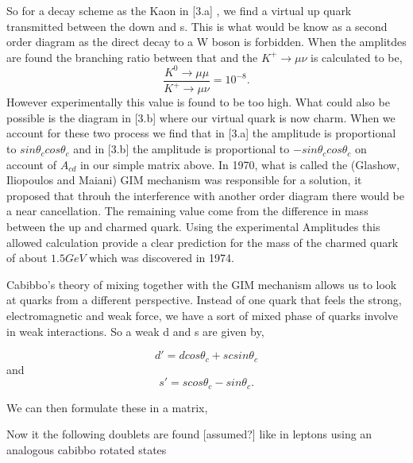 \documentclass[floatfix,aps,prd,amsmath,amssymb]{revtex4}
\begin{document}
So for a decay scheme as the Kaon in [3.a] , we find a virtual up quark transmitted between the down and s. This is what would be know as a second order diagram as the direct decay to a W boson is forbidden.
When the amplitdes are found the branching ratio between that and the $K^+\rightarrow\mu\nu$ is calculated to be,
 \[\frac{K^0\rightarrow\mu\mu}{K^+\rightarrow\mu\nu}=10^{-8}.\]
However experimentally this value is found to be too high. What could also be possible is the diagram in [3.b] where our virtual quark is now charm. When we account for these two process we find that in [3.a] the amplitude is proportional to $sin\theta_c cos\theta_c$ and in [3.b] the amplitude is proportional to $-sin\theta_c cos\theta_c$ on account of $A_{cd}$ in our simple matrix above. 
In 1970, what is called the (Glashow, Iliopoulos and Maiani) GIM mechanism was responsible for a solution, it proposed that throuh the interference with another order diagram there would be a near cancellation. The remaining value come from the difference in mass between the up and charmed quark. Using the experimental Amplitudes this allowed calculation provide a clear prediction for the mass of the charmed quark of about $1.5GeV$ which was discovered in 1974.
 
Cabibbo's theory of mixing together with the GIM mechanism allows us to look at quarks from a different perspective. Instead of one quark that feels the strong, electromagnetic and weak force, we have a sort of mixed phase of quarks involve in weak interactions. So a weak d and s are given by,

\[d' =dcos\theta_c +scsin\theta_c\] and
\[s'=scos\theta_c -sin\theta_c.\]

We can then formulate these in a matrix,


Now it the following doublets are found [assumed?] like in leptons using an analogous cabibbo rotated states
\end{document}
